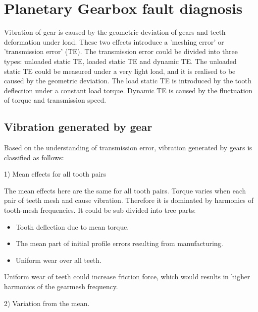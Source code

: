\section{Planetary Gearbox fault diagnosis}

Vibration of gear is caused by the geometric deviation of gears and teeth deformation under load. These two effects introduce a 'meshing error' or 'transmission error' (TE). \cite{vbcm}The transmission error could be divided into three types: unloaded static TE, loaded static TE and dynamic TE. The unloaded static TE could be measured under a very light load, and it is realised to be caused by the geometric deviation. The load static TE is introduced by the tooth deflection under a constant load torque. Dynamic TE is caused by the fluctuation of torque and transmission speed.


\subsection{Vibration generated by gear}

Based on the understanding of transmission error, vibration generated by gears is classified as follows: \cite{vbcm}

1) Mean effects for all tooth pairs

The mean effects here are the same for all tooth pairs. Torque varies when each pair of teeth mesh and cause vibration. Therefore it is dominated by harmonics of tooth-mesh frequencies. It could be sub divided into tree parts: 
\begin{itemize}
\item Tooth deflection due to mean torque.		
\item The mean part of initial profile errors resulting from manufacturing.		
\item Uniform wear over all teeth.
\end{itemize}
Uniform wear of teeth could increase friction force, which would results in higher harmonics of the gearmesh frequency.

2) Variation from the mean.

